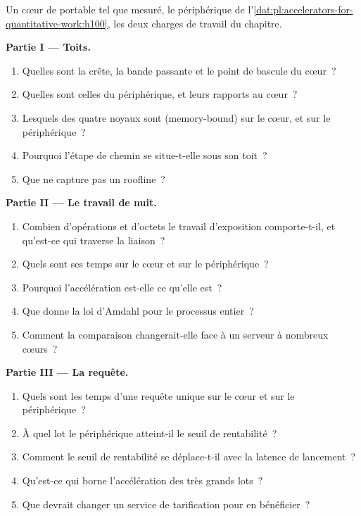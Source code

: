 \begin{problem}\label{pb:pl:accelerators-for-quantitative-work:1}
Un cœur de portable tel que mesuré, le périphérique de l'\cref{dat:pl:accelerators-for-quantitative-work:h100}, les deux charges de travail du chapitre.

\medskip\noindent\textbf{Partie I --- Toits.}
\begin{enumerate}
\item Quelles sont la crête, la bande passante et le point de bascule du cœur~?
\item Quelles sont celles du périphérique, et leurs rapports au cœur~?
\item Lesquels des quatre noyaux sont  (memory-bound) sur le cœur, et sur le périphérique~?
\item Pourquoi l'étape de chemin se situe-t-elle sous son toit~?
\item Que ne capture pas un roofline~?
\end{enumerate}

\medskip\noindent\textbf{Partie II --- Le travail de nuit.}
\begin{enumerate}[resume]
\item Combien d'opérations et d'octets le travail d'exposition comporte-t-il, et qu'est-ce qui traverse la liaison~?
\item Quels sont ses temps sur le cœur et sur le périphérique~?
\item Pourquoi l'accélération est-elle ce qu'elle est~?
\item Que donne la loi d'Amdahl pour le processus entier~?
\item Comment la comparaison changerait-elle face à un serveur à nombreux cœurs~?
\end{enumerate}

\medskip\noindent\textbf{Partie III --- La requête.}
\begin{enumerate}[resume]
\item Quels sont les temps d'une requête unique sur le cœur et sur le périphérique~?
\item À quel lot le périphérique atteint-il le seuil de rentabilité~?
\item Comment le seuil de rentabilité se déplace-t-il avec la latence de lancement~?
\item Qu'est-ce qui borne l'accélération des très grands lots~?
\item Que devrait changer un service de tarification pour en bénéficier~?
\end{enumerate}


\end{problem}
